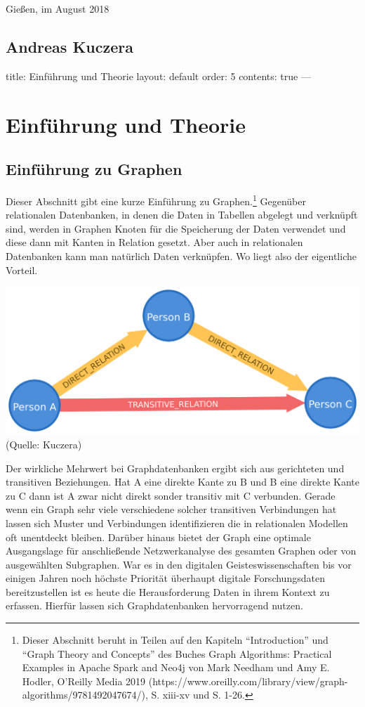 \documentclass[12pt,ngerman,]{article}
\begin{document}
Gießen, im August 2018

\subsection{Andreas Kuczera}\label{andreas-kuczera}

title: Einführung und Theorie layout: default order: 5 contents: true
---

\section{Einführung und Theorie}\label{einfuxfchrung-und-theorie}

\subsection{Einführung zu Graphen}\label{einfuxfchrung-zu-graphen}

Dieser Abschnitt gibt eine kurze Einführung zu Graphen.\footnote{Dieser
  Abschnitt beruht in Teilen auf den Kapiteln ``Introduction'' und
  ``Graph Theory and Concepts'' des Buches Graph Algorithms: Practical
  Examples in Apache Spark and Neo4j von Mark Needham und Amy E. Hodler,
  O'Reilly Media 2019
  (https://www.oreilly.com/library/view/graph-algorithms/9781492047674/),
  S. xiii-xv und S. 1-26.} Gegenüber relationalen Datenbanken, in denen
die Daten in Tabellen abgelegt und verknüpft sind, werden in Graphen
Knoten für die Speicherung der Daten verwendet und diese dann mit Kanten
in Relation gesetzt. Aber auch in relationalen Datenbanken kann man
natürlich Daten verknüpfen. Wo liegt also der eigentliche Vorteil.

\includegraphics{Bilder/directTransitive.png} (Quelle: Kuczera)

Der wirkliche Mehrwert bei Graphdatenbanken ergibt sich aus gerichteten
und transitiven Beziehungen. Hat A eine direkte Kante zu B und B eine
direkte Kante zu C dann ist A zwar nicht direkt sonder transitiv mit C
verbunden. Gerade wenn ein Graph sehr viele verschiedene solcher
transitiven Verbindungen hat lassen sich Muster und Verbindungen
identifizieren die in relationalen Modellen oft unentdeckt bleiben.
Darüber hinaus bietet der Graph eine optimale Ausgangslage für
anschließende Netzwerkanalyse des gesamten Graphen oder von ausgewählten
Subgraphen. War es in den digitalen Geisteswissenschaften bis vor
einigen Jahren noch höchste Priorität überhaupt digitale Forschungsdaten
bereitzustellen ist es heute die Herausforderung Daten in ihrem Kontext
zu erfassen. Hierfür lassen sich Graphdatenbanken hervorragend nutzen.
\end{document}
